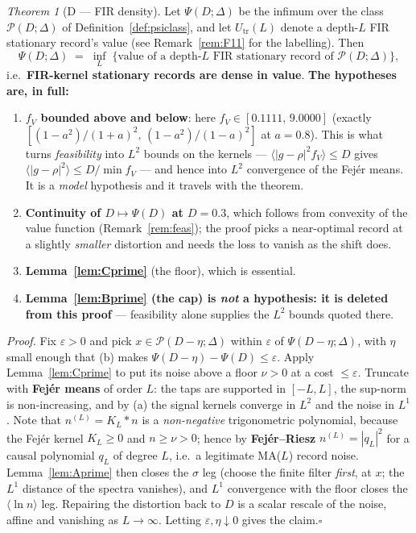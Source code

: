 \documentclass[11pt]{article}
\theoremstyle{definition}
\theoremstyle{remark}
\newtheorem{namedthm}{Theorem}
\begin{document}
\begin{namedthm}[D --- FIR density]
\label{thm:D}
Let $\Psi(D;\Delta)$ be the infimum over the class
$\mathcal P(D;\Delta)$ of Definition~\ref{def:psiclass}, and let
$U_{\mathrm{tr}}(L)$ denote a depth-$L$ FIR stationary record's value (see
Remark~\ref{rem:F11} for the labelling). Then
\[
\Psi(D;\Delta)\;=\;\inf_{L}\;\bigl\{\text{value of a depth-}L\text{ FIR
stationary record of }\mathcal P(D;\Delta)\bigr\},
\]
i.e.\ \textbf{FIR-kernel stationary records are dense in value}.
\textbf{The hypotheses are, in full:}
\begin{enumerate}
\item[(a)] \textbf{$f_V$ bounded above and below}: here $f_V\in[0.1111,\,
9.0000]$ (exactly $[(1-a^2)/(1+a)^2,\,(1-a^2)/(1-a)^2]$ at $a=0.8$). This is
what turns \emph{feasibility} into $L^2$ bounds on the kernels ---
$\langle|g-\rho|^2f_V\rangle\le D$ gives $\langle|g-\rho|^2\rangle\le
D/\min f_V$ --- and hence into $L^2$ convergence of the Fej\'er means. It is a
\emph{model} hypothesis and it travels with the theorem.
\item[(b)] \textbf{Continuity of $D\mapsto\Psi(D)$ at $D=0.3$}, which follows
from convexity of the value function (Remark~\ref{rem:feas}); the proof picks
a near-optimal record at a slightly \emph{smaller} distortion and needs the
loss to vanish as the shift does.
\item[(c)] \textbf{Lemma~\ref{lem:Cprime}} (the floor), which is
essential.
\item[(d)] \textbf{Lemma~\ref{lem:Bprime} (the cap) is \emph{not} a
hypothesis: it is deleted from this proof} --- feasibility alone supplies the
$L^2$ bounds quoted there.
\end{enumerate}
\emph{Proof.} Fix $\varepsilon>0$ and pick $x\in\mathcal P(D-\eta;\Delta)$
within $\varepsilon$ of $\Psi(D-\eta;\Delta)$, with $\eta$ small enough that
(b) makes $\Psi(D-\eta)-\Psi(D)\le\varepsilon$. Apply
Lemma~\ref{lem:Cprime} to put its noise above a floor $\nu>0$ at a cost
$\le\varepsilon$. Truncate with \textbf{Fej\'er means}
\cite{bib:fejer04} of order $L$: the taps are supported in $[-L,L]$, the
sup-norm is non-increasing, and by (a) the signal kernels converge in $L^2$
and the noise in $L^1$. Note that $n^{(L)}=K_L\ast n$ is a \emph{non-negative}
trigonometric polynomial, because the Fej\'er kernel $K_L\ge0$ and $n\ge\nu>0$;
hence by \textbf{Fej\'er--Riesz} \cite{bib:fejer16,bib:riesz16}
$n^{(L)}=|q_L|^2$ for a causal polynomial $q_L$ of degree $L$, i.e.\ a
legitimate MA($L$) record noise. Lemma~\ref{lem:Aprime} then closes the
$\sigma$ leg (choose the finite filter \emph{first}, at $x$; the $L^1$
distance of the spectra vanishes), and $L^1$ convergence with the floor closes
the $\langle\ln n\rangle$ leg. Repairing the distortion back to $D$ is a
scalar rescale of the noise, affine and vanishing as $L\to\infty$. Letting
$\varepsilon,\eta\downarrow0$ gives the claim.\hfill$\square$


\end{namedthm}
\end{document}
